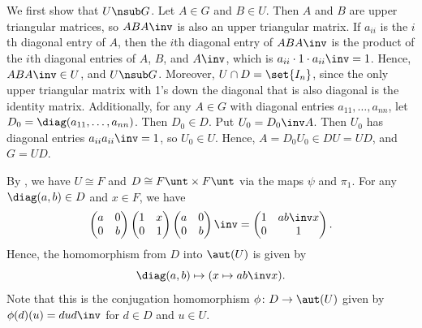 \begin{solenum}
    \item We first show that $U \nsub G$.
    Let $A \in G$ and $B \in U$.
    Then $A$ and $B$ are upper triangular matrices, so $ABA\inv$ is also an upper triangular matrix.
    If $a_{ii}$ is the $i$th diagonal entry of $A$, then the $i$th diagonal entry of $ABA\inv$ is the product of the $i$th diagonal entries of $A$, $B$, and $A\inv$, which is $a_{ii} \cdot 1 \cdot a_{ii}\inv = 1$.
    Hence, $ABA\inv \in U$, and $U \nsub G$.
    Moreover, $U \cap D = \set{I_n}$, since the only upper triangular matrix with 1's down the diagonal that is also diagonal is the identity matrix.
    Additionally, for any $A \in G$ with diagonal entries $a_{11}, \ldots, a_{nn}$, let $D_0 = \diag(a_{11}, \ldots, a_{nn})$.
    Then $D_0 \in D$.
    Put $U_0 = D_0\inv A$.
    Then $U_0$ has diagonal entries $a_{ii}a_{ii}\inv = 1$, so $U_0 \in U$.
    Hence, $A = D_0U_0 \in DU = UD$, and $G = UD$.
    \item By , we have $U \cong F$ and $D \cong F\unt \times F\unt$ via the maps $\psi$ and $\pi_1$.
    For any $\diag(a, b) \in D$ and $x \in F$, we have
    \[
        \begin{pmatrix}
            a & 0 \\
            0 & b
        \end{pmatrix}
        \begin{pmatrix}
            1 & x \\
            0 & 1
        \end{pmatrix}
        \begin{pmatrix}
            a & 0 \\
            0 & b
        \end{pmatrix}\inv
        =
        \begin{pmatrix}
            1 & a b\inv x \\
            0 & 1
        \end{pmatrix}.
    \]
    Hence, the homomorphism from $D$ into $\aut(U)$ is given by
    \[
        \diag(a, b) \mapsto (x \mapsto ab\inv x).
    \]
    Note that this is the conjugation homomorphism $\phi \colon D \to \aut(U)$ given by $\phi(d)(u) = dud\inv$ for $d \in D$ and $u \in U$.
\end{solenum}


